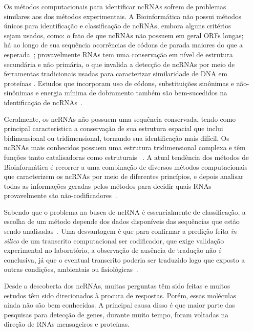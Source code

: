 	Os métodos computacionais para identificar ncRNAs sofrem de problemas similares aos dos métodos experimentais. A Bioinformática não possui métodos únicos para identificação e classificação de ncRNAs, embora alguns critérios sejam usados, como: o fato de que ncRNAs não possuem em geral ORFs longas; há ao longo de sua sequência ocorrências de códons de parada maiores do que a esperada~\citep{wahlestedt2006natural:2006}; provavelmente RNAs tem uma conservação em nível de estrutura secundária e não primária, o que invalida a detecção de ncRNAs por meio de ferramentas tradicionais usadas para caracterizar similaridade de DNA em proteínas \citep{pang2006rapid:2006,rivas2001noncoding:2001,torarinsson2006thousands:2006}. Estudos que incorporam uso de códons, substituições sinônimas e não-sinônimas e energia mínima de dobramento também são bem-sucedidos na identificação de ncRNAs~\citep{badger1999critica:1999,torarinsson2006thousands:2006,xue2005classification:2005}.
	
	Geralmente, os ncRNAs não possuem uma sequência conservada, tendo como principal característica a conservação de sua estrutura espacial que inclui bidimensional ou tridimensional, tornando sua identificação mais difícil. Os ncRNAs mais conhecidos  possuem uma estrutura tridimensional complexa e têm funções tanto catalisadoras como estruturais ~\citep{eddy:2002}. A atual tendência dos métodos de Bioinformática é recorrer a uma combinação de diversos métodos computacionais que caracterizem os ncRNAs por meio de diferentes princípios, e depois analisar todas as informações geradas pelos métodos para decidir quais RNAs provavelmente são
não-codificadores~\citep{mignone2006discrimination:2006,liu:2006}.
	
	
	Sabendo que o problema na busca de ncRNA é essencialmente de classificação,  a escolha de um método depende dos dados disponíveis das sequências que estão sendo analisadas~\citep{rivas2001noncoding:2001,wang2006psol:2006}.  Uma desvantagem é que para confirmar a predição feita \textit{in silico} de um transcrito computacional ser codificador, que exige validação experimental no laboratório, a observação de ausência de tradução não é conclusiva, já que o eventual transcrito poderia ser traduzido logo que exposto a outras condições, ambientais ou fisiológicas~\citep{mignone2006discrimination:2006,liu:2006}.


Desde a descoberta dos ncRNAs, muitas perguntas têm sido feitas e muitos estudos têm sido direcionados à procura de respostas. Porém, essas moléculas ainda não são bem conhecidas. A principal causa disso é que maior parte das pesquisas para detecção de genes, durante muito tempo, foram voltadas na direção de RNAs mensageiros e proteínas.


